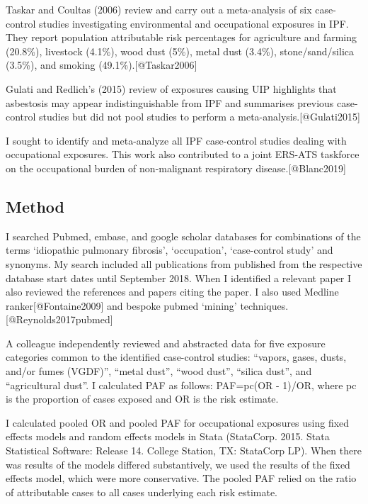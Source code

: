 \documentclass[
]{article}
\begin{document}
Taskar and Coultas (2006) review and carry out a meta-analysis of six
case-control studies investigating environmental and occupational
exposures in IPF. They report population attributable risk percentages
for agriculture and farming (20.8\%), livestock (4.1\%), wood dust
(5\%), metal dust (3.4\%), stone/sand/silica (3.5\%), and smoking
(49.1\%).{[}@Taskar2006{]}

Gulati and Redlich's (2015) review of exposures causing UIP highlights
that asbestosis may appear indistinguishable from IPF and summarises
previous case-control studies but did not pool studies to perform a
meta-analysis.{[}@Gulati2015{]}

I sought to identify and meta-analyze all IPF case-control studies
dealing with occupational exposures. This work also contributed to a
joint ERS-ATS taskforce on the occupational burden of non-malignant
respiratory disease.{[}@Blanc2019{]}

\hypertarget{method}{%
\subsection{Method}\label{method}}

I searched Pubmed, embase, and google scholar databases for combinations
of the terms `idiopathic pulmonary fibrosis', `occupation',
`case-control study' and synonyms. My search included all publications
from published from the respective database start dates until September
2018. When I identified a relevant paper I also reviewed the references
and papers citing the paper. I also used Medline
ranker{[}@Fontaine2009{]} and bespoke pubmed `mining'
techniques.{[}@Reynolds2017pubmed{]}

A colleague independently reviewed and abstracted data for five exposure
categories common to the identified case-control studies: ``vapors,
gases, dusts, and/or fumes (VGDF)'', ``metal dust'', ``wood dust'',
``silica dust'', and ``agricultural dust''. I calculated PAF as follows:
PAF=pc(OR - 1)/OR, where pc is the proportion of cases exposed and OR is
the risk estimate.

I calculated pooled OR and pooled PAF for occupational exposures using
fixed effects models and random effects models in Stata (StataCorp.
2015. Stata Statistical Software: Release 14. College Station, TX:
StataCorp LP). When there was results of the models differed
substantively, we used the results of the fixed effects model, which
were more conservative. The pooled PAF relied on the ratio of
attributable cases to all cases underlying each risk estimate.
\end{document}
